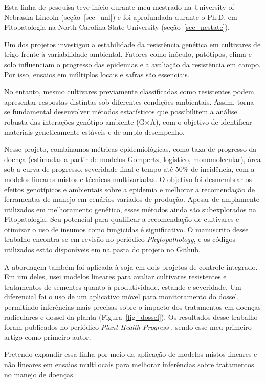 \documentclass[12pt,a4paper,oneside]{book}
\newcommand{\UNL}{University of Nebraska-Lincoln}
\newcommand{\NCState}{North Carolina State University}
\begin{document}
Esta linha de pesquisa teve início durante meu mestrado na \UNL{} (seção~\ref{sec_unl}) e foi aprofundada durante
o Ph.D. em Fitopatologia na \NCState{} (seção~\ref{sec_ncstate}).

Um dos projetos investigou a estabilidade da resistência genética em cultivares de trigo frente à variabilidade ambiental. 
Fatores como inóculo, patótipos, clima e solo influenciam o progresso das epidemias e a avaliação da resistência 
em campo. Por isso, ensaios em múltiplos locais e safras são essenciais.

No entanto, mesmo cultivares previamente classificadas como resistentes podem apresentar respostas distintas sob 
diferentes condições ambientais. Assim, torna-se fundamental desenvolver métodos estatísticos que possibilitem
a análise robusta das interações genótipo-ambiente (G×A), com o objetivo de identificar materiais 
geneticamente estáveis e de amplo desempenho.

Nesse projeto, combinamos métricas epidemiológicas, como taxa de 
progresso da doença (estimadas a partir de modelos Gompertz, logístico, monomolecular), área sob a curva de progresso, 
severidade final e tempo até  50\% de incidência, com a modelos lineares mistos e 
técnicas multivariadas. O objetivo foi desmembrar os efeitos genotípicos e ambientais sobre 
a epidemia e melhorar a recomendação de ferramentas de manejo em cenários variados de produção.
Apesar de amplamente utilizados em melhoramento genético, esses métodos ainda são subexplorados na Fitopatologia. 
Seu potencial para qualificar a recomendação de cultivares e otimizar o uso de insumos como fungicidas é 
significativo. O manuscrito desse trabalho encontra-se em revisão no periódico \emph{Phytopathology}, e os códigos
utilizados estão disponíveis em na pasta do projeto no \href{https://github.com/vcgarnica/SNB_stability}{Github}.

A abordagem também foi aplicada à soja em dois projetos de controle integrado. Em um deles, usei modelos lineares para 
avaliar cultivares resistentes e tratamentos de sementes quanto à produtividade, estande e severidade. 
Um diferencial foi o uso de um aplicativo móvel para monitoramento do dossel, permitindo inferências mais
precisas sobre o impacto dos tratamentos em doenças radiculares e dossel da planta (Figura~\ref{fig_dossel}). 
Os resultados desse trabalho foram publicados no periódico \emph{Plant Health Progress} \citep{Garnica2019}, sendo esse
meu primeiro artigo como primeiro autor.

Pretendo expandir essa linha por meio da aplicação de modelos mistos lineares e não lineares em 
ensaios multilocais para melhorar inferências sobre tratamentos no manejo de doenças. 
\end{document}
